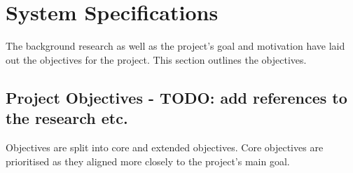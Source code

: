 \chapter{System Specifications}
\label{ch:specifications}
The background research as well as the project's goal and motivation have laid out the objectives for the project. This section outlines the objectives.
\section{Project Objectives - TODO: add references to the research etc.}
Objectives are split into core and extended objectives. Core objectives are prioritised as they aligned more closely to the project's main goal.

